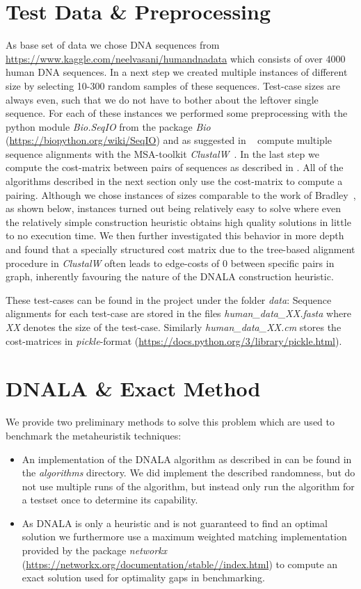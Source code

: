 \documentclass[12pt]{article}
\begin{document}
\section{Test Data \& Preprocessing}
\label{sec:test-data}
As base set of data we chose DNA sequences from \url{https://www.kaggle.com/neelvasani/humandnadata} which consists of over 4000 human DNA sequences.
In a next step we created multiple instances of different size by selecting 10-300 random samples of these sequences.
Test-case sizes are always even, such that we do not have to bother about the leftover single sequence.
For each of these instances we performed some preprocessing with the python module \textit{Bio.SeqIO} from the package \textit{Bio} (\url{https://biopython.org/wiki/SeqIO}) and as suggested in ~\cite{mainpaper} compute multiple sequence alignments with the MSA-toolkit \emph{ClustalW}~\cite{clustalw}. 
In the last step we compute the cost-matrix between pairs of sequences as described in \cite{mainpaper}.
All of the algorithms described in the next section only use the cost-matrix to compute a pairing.
Although we chose instances of sizes comparable to the work of Bradley~\cite{mainpaper}, as shown below, instances turned out being relatively easy to solve where even the relatively simple construction heuristic obtains high quality solutions in little to no execution time. We then further investigated this behavior in more depth and found that a specially structured cost matrix due to the tree-based alignment procedure in \emph{ClustalW} often leads to edge-costs of $0$ between specific pairs in graph, inherently favouring the nature of the DNALA construction heuristic. 

These test-cases can be found in the project under the folder \textit{data}:
Sequence alignments for each test-case are stored in the files \textit{human\_data\_XX.fasta} where \textit{XX} denotes the size of the test-case.
Similarly \textit{human\_data\_XX.cm} stores the cost-matrices in \textit{pickle}-format (\url{https://docs.python.org/3/library/pickle.html}).

\section{DNALA \& Exact Method}
We provide two preliminary methods to solve this problem which are used to benchmark the metaheuristik techniques:
\begin{itemize}
    \item An implementation of the DNALA algorithm as described in \cite{mainpaper} can be found in the \textit{algorithms} directory.
    We did implement the described randomness, but do not use multiple runs of the algorithm, but instead only run the algorithm for a testset once to determine its capability.

    \item As DNALA is only a heuristic and is not guaranteed to find an optimal solution we furthermore use a maximum weighted matching implementation provided by the package \textit{networkx} (\url{https://networkx.org/documentation/stable//index.html}) to compute an exact solution used for optimality gaps in benchmarking.
\end{itemize}
\end{document}
